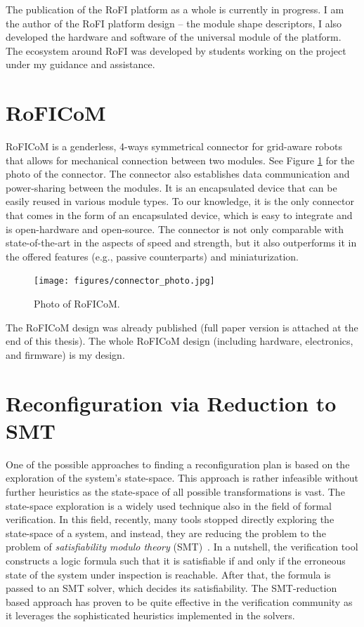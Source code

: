 The publication of the RoFI platform as a whole is currently in progress. I am
the author of the RoFI platform design -- the module shape descriptors, I also
developed the hardware and software of the universal module of the platform. The
ecosystem around RoFI was developed by students working on the project under my
guidance and assistance.

\section{RoFICoM}\label{connector}

RoFICoM is a genderless, 4-ways symmetrical connector for grid-aware robots that
allows for mechanical connection between two modules. See Figure
\ref{fig:roficom} for the photo of the connector. The connector also establishes
data communication and power-sharing between the modules. It is an encapsulated
device that can be easily reused in various module types. To our knowledge, it
is the only connector that comes in the form of an encapsulated device, which is
easy to integrate and is open-hardware and open-source. The connector is not
only comparable with state-of-the-art in the aspects of speed and strength, but
it also outperforms it in the offered features (e.g., passive counterparts) and
miniaturization.

\begin{figure}[t]
    \centering
    \texttt{[image: figures/connector\_photo.jpg]}
    \caption{Photo of RoFICoM.}
    \label{fig:roficom}
\end{figure}

The RoFICoM design was already published \cite{DBLP:conf/iros/MrazekB19} (full
paper version is attached at the end of this thesis). The whole RoFICoM design
(including hardware, electronics, and firmware) is my design.

\section{Reconfiguration via Reduction to SMT}\label{smt}

One of the possible approaches to finding a reconfiguration plan is based on the
exploration of the system's state-space. This approach is rather infeasible
without further heuristics as the state-space of all possible transformations is
vast. The state-space exploration is a widely used technique also in the field
of formal verification. In this field, recently, many tools stopped directly
exploring the state-space of a system, and instead, they are reducing the
problem to the problem of \emph{satisfiability modulo theory}
(SMT)~\cite{DBLP:series/faia/2009-185}. In a nutshell, the verification tool
constructs a logic formula such that it is satisfiable if and only if the
erroneous state of the system under inspection is reachable. After that, the
formula is passed to an SMT solver, which decides its satisfiability. The
SMT-reduction based approach has proven to be quite effective in the
verification community as it leverages the sophisticated heuristics implemented
in the solvers.

